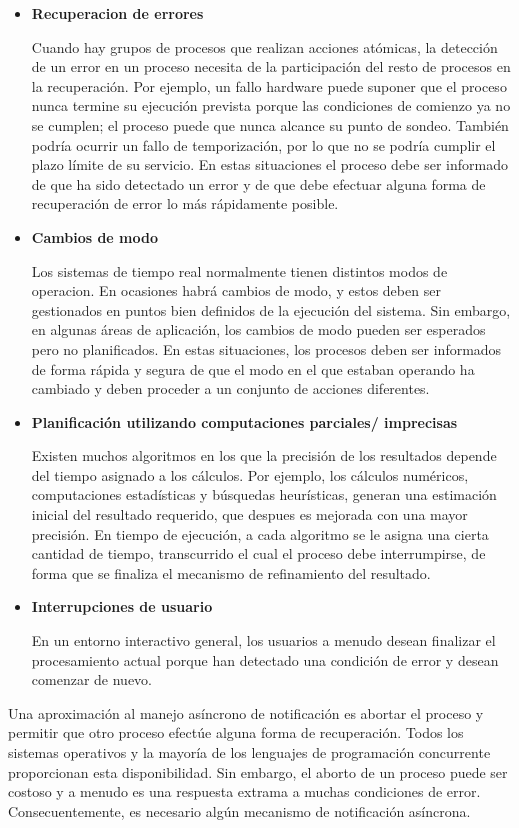 \begin{itemize}
	\item \textbf{Recuperacion de errores}
		
		Cuando hay grupos de procesos que
		realizan acciones atómicas, la detección de un error en un
		proceso necesita de la participación del resto de procesos en la
		recuperación. Por ejemplo, un fallo hardware puede suponer que
		el proceso nunca termine su ejecución prevista porque las
		condiciones de comienzo ya no se cumplen; el proceso puede que
		nunca alcance su punto de sondeo. También podría ocurrir un
		fallo de temporización, por lo que no se podría cumplir el plazo
		límite de su servicio. En estas situaciones el proceso debe ser
		informado de que ha sido detectado un error y de que debe
		efectuar alguna forma de recuperación de error lo más
		rápidamente posible.

	\item \textbf{Cambios de modo}
		
		Los sistemas de tiempo real normalmente tienen
		distintos modos de operacion. En ocasiones habrá cambios de
		modo, y estos deben ser gestionados en puntos bien definidos de
		la ejecución del sistema. Sin embargo, en algunas áreas de
		aplicación, los cambios de modo pueden ser esperados pero no
		planificados. En estas situaciones, los procesos deben ser
		informados de forma rápida y segura de que el modo en el que
		estaban operando ha cambiado y deben proceder a un conjunto de
		acciones diferentes.

	\item \textbf{Planificación utilizando computaciones parciales/
		imprecisas}

		Existen muchos algoritmos en los que la precisión de los
		resultados depende del tiempo asignado a los cálculos. Por
		ejemplo, los cálculos numéricos, computaciones estadísticas y
		búsquedas heurísticas, generan una estimación inicial del
		resultado requerido, que despues es mejorada con una mayor
		precisión. En tiempo de ejecución, a cada algoritmo se le asigna
		una cierta cantidad de tiempo, transcurrido el cual el proceso
		debe interrumpirse, de forma que se finaliza el mecanismo de
		refinamiento del resultado.

	\item \textbf{Interrupciones de usuario}
		
		En un entorno interactivo general, los
		usuarios a menudo desean finalizar el procesamiento actual
		porque han detectado una condición de error y desean comenzar de
		nuevo.
\end{itemize}

Una aproximación al manejo asíncrono de notificación es abortar el proceso y
permitir que otro proceso efectúe alguna forma de recuperación. Todos los
sistemas operativos y la mayoría de los lenguajes de programación concurrente
proporcionan esta disponibilidad. Sin embargo, el aborto de un proceso puede ser
costoso y a menudo es una respuesta extrama a muchas condiciones de error.
Consecuentemente, es necesario algún mecanismo de notificación asíncrona.

